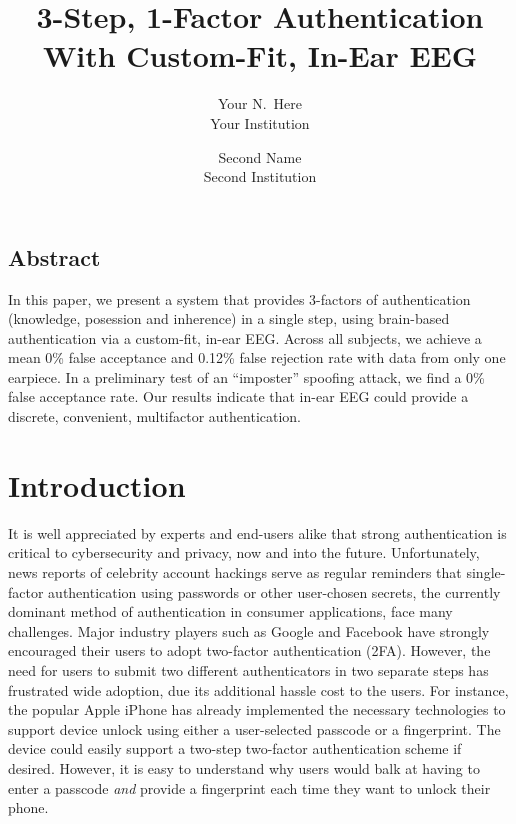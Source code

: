 \documentclass[letterpaper,twocolumn,10pt]{article}
\begin{document}
\date{}

\title{\Large \bf 3-Step, 1-Factor Authentication With Custom-Fit, In-Ear EEG}

\author{
{\rm Your N.\ Here}\\
Your Institution
\and
{\rm Second Name}\\
Second Institution
} %

\maketitle

\thispagestyle{empty}


\subsection*{Abstract}
In this paper, we present a system that provides 3-factors of authentication (knowledge, posession and inherence) in a single step, using brain-based authentication via a custom-fit, in-ear EEG. Across all subjects, we achieve a mean 0\% false acceptance and 0.12\% false rejection rate with data from only one earpiece. In a preliminary test of an ``imposter'' spoofing attack, we find a 0\% false acceptance rate. Our results indicate that in-ear EEG could provide a discrete, convenient, multifactor authentication.

\section{Introduction}
\label{sec:org7196b99}

It is well appreciated by experts and end-users alike that strong authentication is
critical to cybersecurity and privacy, now and into the future. Unfortunately,
news 
reports of celebrity account hackings serve as regular reminders that
single-factor authentication using passwords or other user-chosen secrets, 
the currently dominant method of authentication in consumer applications, 
face many challenges. Major industry players such as Google and
Facebook have strongly encouraged their users to adopt two-factor
authentication (2FA). However, the need for users to submit two different 
authenticators in two separate steps has frustrated wide adoption, 
due its additional hassle cost to the users. For instance, the popular Apple
iPhone has already implemented the necessary technologies to support device
unlock using either a user-selected passcode or a fingerprint. The
device could easily support a two-step two-factor authentication scheme if
desired. However, it is easy to understand why users would balk at having to
enter a passcode \emph{and} provide a fingerprint each time they want to unlock their phone.
\end{document}
